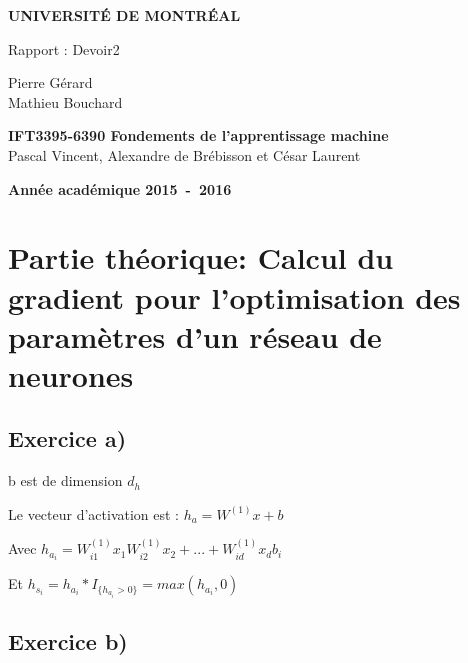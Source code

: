 \documentclass[a4paper,10pt]{article}
\begin{document}
\begin{titlepage}
\begin{center}
\textbf{\textsc{UNIVERSIT\'E DE MONTR\'EAL}}\\
\vfill{}\vfill{}
\begin{center}{\Huge Rapport : Devoir2 }\end{center}{\Huge \par}
\begin{center}{\large Pierre Gérard \\ Mathieu Bouchard}\end{center}{\Huge \par}
\vfill{}\vfill{} \vfill{}
\begin{center}{\large \textbf{IFT3395-6390 Fondements de l'apprentissage machine}}\hfill{\\Pascal Vincent, Alexandre de Brébisson et César Laurent}\end{center}{\large\par}
\vfill{}\vfill{}\enlargethispage{3cm}
\textbf{Année académique 2015~-~2016}
\end{center}
\end{titlepage}



\tableofcontents

\pagebreak

\section{Partie théorique: Calcul du gradient pour l’optimisation des paramètres d'un réseau de neurones}

\subsection{Exercice a)}

b est de dimension $d_{h}$

Le vecteur d'activation est : $h_{a} = W^{(1)}x +b$

Avec $ h_{a_i} = W^{(1)}_{i1} x_{1}  W^{(1)}_{i2} x_{2} + ... + W^{(1)}_{id} x_{d} b_{i}$

Et $h_{s_i} = h_{a_i}*I_{ \{ h_{a_i} > 0 \} } = max(h_{a_i}, 0)$

\subsection{Exercice b)}
\end{document}
